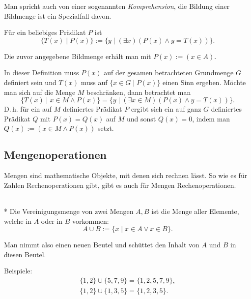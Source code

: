 Man spricht auch von einer sogenannten \emph{Komprehension},
die Bildung einer Bildmenge ist ein Spezialfall davon.
\begin{Definition}[Komprehension]
Für ein beliebiges Prädikat $P$ ist
\[\{T(x)\mid P(x)\} := \{y\mid(\exists x)(P(x)\land y=T(x))\}.\]
\end{Definition}
Die zuvor angegebene Bildmenge erhält man mit $P(x):=(x\in A)$.

In dieser Definition muss $P(x)$ auf der gesamen betrachteten Grundmenge
$G$ definiert sein und $T(x)$ muss auf $\{x\in G\mid P(x)\}$ einen
Sinn ergeben. Möchte man sich auf die Menge $M$ beschränken,
dann betrachtet man
\[\{T(x)\mid x\in M\land P(x)\} = \{y\mid(\exists x\in M)(P(x)\land y=T(x))\}.\]
D.\,h. für ein auf $M$ definiertes Prädikat $P$ ergibt sich ein
auf ganz $G$ definiertes Prädikat $Q$ mit $P(x)=Q(x)$ auf $M$ und
sonst $Q(x)=0$, indem man $Q(x):=(x\in M\land P(x))$ setzt.

\newpage
\subsection{Mengenoperationen}

Mengen sind mathematische Objekte, mit denen sich rechnen lässt.
So wie es für Zahlen Rechenoperationen gibt, gibt es auch für
Mengen Rechenoperationen.
\begin{Definition}[Vereinigungsmenge]%
\mbox{}\\*
Die Vereinigungsmenge von zwei Mengen $A,B$ ist die Menge aller Elemente,
welche in $A$ oder in $B$ vorkommen:
\[A\cup B := \{x\mid x\in A\lor x\in B\}.\]
\end{Definition}
Man nimmt also einen neuen Beutel und schüttet den Inhalt von $A$
und $B$ in diesen Beutel.

Beispiele:
\begin{gather*}
\{1,2\}\cup\{5,7,9\} = \{1,2,5,7,9\},\\
\{1,2\}\cup\{1,3,5\} = \{1,2,3,5\}.
\end{gather*}

